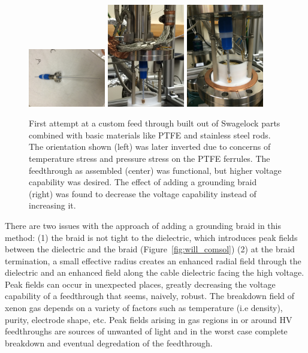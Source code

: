 \begin{figure}[htbp]
\begin{center}
\includegraphics[width=0.3\textwidth, angle=-90]{figures/testbed/ft4_1.jpg}
\includegraphics[width=0.3\textwidth, angle=-90]{figures/testbed/ft4_2.jpg}
\includegraphics[width=0.3\textwidth, angle=-90]{figures/testbed/ft4_3.jpg}

\caption{First attempt at a custom feed through built out of Swagelock parts combined with basic materials like \ac{PTFE} and stainless steel rods. The orientation shown (left) was later inverted due to concerns of temperature stress and pressure stress on the \ac{PTFE} ferrules. The feedthrough as assembled (center) was functional, but higher voltage capability was desired. The effect of adding a grounding braid (right) was found to decrease the voltage capability instead of increasing it.  }
\label{fig:ft4}
\end{center}
\end{figure}


There are two issues with the approach of adding a grounding braid in this method: (1) the braid is not tight to the dielectric, which introduces peak fields between the dielectric and the braid (Figure~\ref{fig:will_comsol}) (2) at the braid termination, a small effective radius creates an enhanced radial field through the  dielectric and an enhanced field along the cable dielectric facing the high voltage. Peak fields can occur in unexpected places, greatly decreasing the voltage capability of a feedthrough that seems, naively, robust. The breakdown field of xenon gas depends on a variety of factors such as temperature (i.e density), purity, electrode shape, etc. Peak fields arising in gas regions in or around \ac{HV} feedthroughs are sources of unwanted of light and in the worst case complete breakdown and eventual degredation of the feedthrough. 

